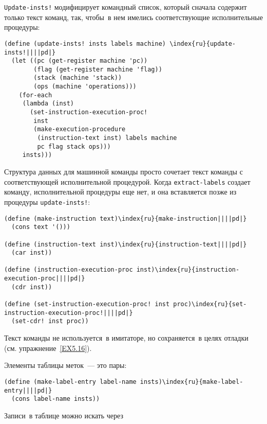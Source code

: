 {\tt Update-insts!} модифицирует командный список,
который сначала содержит только текст команд, так, чтобы~в нем имелись
соответствующие исполнительные процедуры:

\begin{Verbatim}[fontsize=\small]
(define (update-insts! insts labels machine) \index{ru}{update-insts!||||pd|}
  (let ((pc (get-register machine 'pc))
        (flag (get-register machine 'flag))
        (stack (machine 'stack))
        (ops (machine 'operations)))
    (for-each
     (lambda (inst)
       (set-instruction-execution-proc! 
        inst
        (make-execution-procedure
         (instruction-text inst) labels machine
         pc flag stack ops)))
     insts)))
\end{Verbatim}

Структура данных для машинной команды просто сочетает текст
команды с соответствующей исполнительной процедурой.  Когда
{\tt extract-labels} создает команду, исполнительной процедуры
еще нет, и она вставляется позже из процедуры
{\tt update-insts!}:

\begin{Verbatim}[fontsize=\small]
(define (make-instruction text)\index{ru}{make-instruction||||pd|}
  (cons text '()))

(define (instruction-text inst)\index{ru}{instruction-text||||pd|}
  (car inst))

(define (instruction-execution-proc inst)\index{ru}{instruction-execution-proc||||pd|}
  (cdr inst))

(define (set-instruction-execution-proc! inst proc)\index{ru}{set-instruction-execution-proc!||||pd|}
  (set-cdr! inst proc))
\end{Verbatim}
Текст команды не используется~в имитаторе, но сохраняется~в целях
отладки (см. упражнение~\ref{EX5.16}).

Элементы таблицы меток~--- это пары:

\begin{Verbatim}[fontsize=\small]
(define (make-label-entry label-name insts)\index{ru}{make-label-entry||||pd|}
  (cons label-name insts))
\end{Verbatim}
Записи~в таблице можно искать через

